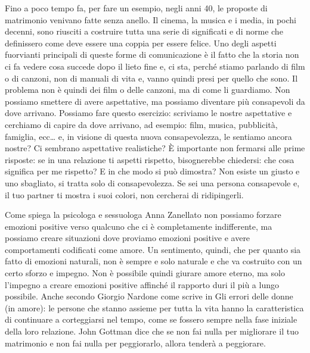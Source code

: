 \documentclass[12pt]{book} %
\begin{document}
Fino a poco tempo fa, per fare un esempio, negli anni 40, le proposte di matrimonio venivano fatte senza anello. Il
cinema, la musica e i media, in pochi decenni, sono riusciti a costruire tutta una serie di significati e di norme che
definissero come deve essere una coppia per essere felice. Uno degli aspetti fuorvianti principali di queste forme di
comunicazione è il fatto che la storia non ci fa vedere cosa succede dopo il lieto fine e, ci sta, perché stiamo
parlando di film o di canzoni, non di manuali di vita e, vanno quindi presi per quello che sono. Il problema non è
quindi dei film o delle canzoni, ma di come li guardiamo. Non possiamo smettere di avere aspettative, ma possiamo
diventare più consapevoli da dove arrivano. Possiamo fare questo esercizio: scriviamo le nostre aspettative e cerchiamo
di capire da dove arrivano, ad esempio: film, musica, pubblicità, famiglia, ecc… e, in visione di questa nuova
consapevolezza, le sentiamo ancora nostre? Ci sembrano aspettative realistiche? È importante non fermarsi alle prime
risposte: se in una relazione ti aspetti rispetto, bisognerebbe chiedersi: che cosa significa per me rispetto? E in che
modo si può dimostra? Non esiste un giusto e uno sbagliato, si tratta solo di consapevolezza. Se sei una persona
consapevole e, il tuo partner ti mostra i suoi colori, non cercherai di ridipingerli.


\bigskip

Come spiega la psicologa e sessuologa Anna Zanellato non possiamo forzare emozioni positive verso qualcuno che ci è
completamente indifferente, ma possiamo creare situazioni dove proviamo emozioni positive e avere comportamenti
codificati come amore. Un sentimento, quindi, che per quanto sia fatto di emozioni naturali, non è sempre e solo
naturale e che va costruito con un certo sforzo e impegno. Non è possibile quindi giurare amore eterno, ma solo
l'impegno a creare emozioni positive affinché il rapporto duri il più a lungo
possibile. Anche secondo Giorgio
Nardone come scrive in Gli errori delle donne (in amore): le persone
che stanno assieme per tutta la vita hanno la caratteristica di continuare a corteggiarsi nel tempo, come se fossero
sempre nella fase iniziale della loro relazione. John Gottman dice che se non fai nulla per migliorare il tuo
matrimonio e non fai nulla per peggiorarlo, allora tenderà a peggiorare.


\bigskip
\end{document}
